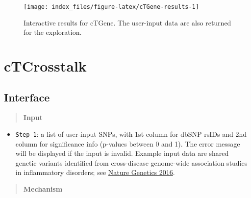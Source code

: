 \documentclass[
  oneside]{book}
\providecommand{\tightlist}{%
  \setlength{\itemsep}{0pt}\setlength{\parskip}{0pt}}
\begin{document}
\begin{figure}

{\centering \texttt{[image: index\_files/figure-latex/cTGene-results-1]} 

}

\caption{Interactive results for cTGene. The user-input data are also returned for the exploration.}\label{fig:cTGene-results}
\end{figure}

\hypertarget{ctcrosstalk}{%
\chapter{cTCrosstalk}\label{ctcrosstalk}}

\hypertarget{interface-4}{%
\section{Interface}\label{interface-4}}

\begin{quote}
\textbf{Input}
\end{quote}

\begin{itemize}
\tightlist
\item
  \texttt{Step\ 1}: a list of user-input SNPs, with 1st column for dbSNP rsIDs and 2nd column for significance info (p-values between 0 and 1). The error message will be displayed if the input is invalid. Example input data are shared genetic variants identified from cross-disease genome-wide association studies in inflammatory disorders; see \href{https://www.ncbi.nlm.nih.gov/pubmed/26974007}{Nature Genetics 2016}.
\end{itemize}

\begin{quote}
\textbf{Mechanism}
\end{quote}
\end{document}
